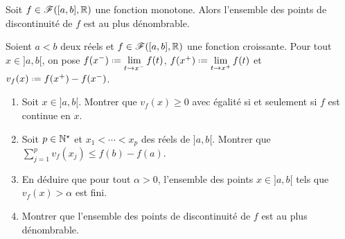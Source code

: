 \begin{prop}
    Soit $f \in \mathscr{F}([a, b], \mathbb{R})$ une fonction monotone. Alors l'ensemble des points de discontinuité de $f$ est au plus dénombrable. 
\end{prop}

\begin{exercice}
    Soient $a < b$ deux réels et $f \in \mathscr{F}([a, b], \mathbb{R})$ une fonction croissante. Pour tout $x \in ]a, b[$, on pose $f(x^-) \defeq \lim\limits_{t \to x^-} f(t)$, $f(x^+) \defeq \lim\limits_{t \to x^+} f(t)$ et $v_f(x) \defeq f(x^+)-f(x^-)$.
    \begin{enumerate}
        \item Soit $x \in ]a, b[$. Montrer que $v_f(x) \geqslant 0$ avec égalité si et seulement si $f$ est continue en $x$.
        \item Soit $p \in \mathbb{N}^\star$ et $x_1 < \cdots < x_p$ des réels de $]a, b[$. Montrer que $\sum\limits_{j=1}^p v_f(x_j) \leqslant f(b)-f(a)$.
        \item En déduire que pour tout $\alpha > 0$, l'ensemble des points $x \in ]a, b[$ tels que $v_f(x) > \alpha$ est fini. 
        \item Montrer que l'ensemble des points de discontinuité de $f$ est au plus dénombrable. 
    \end{enumerate}
\end{exercice}

